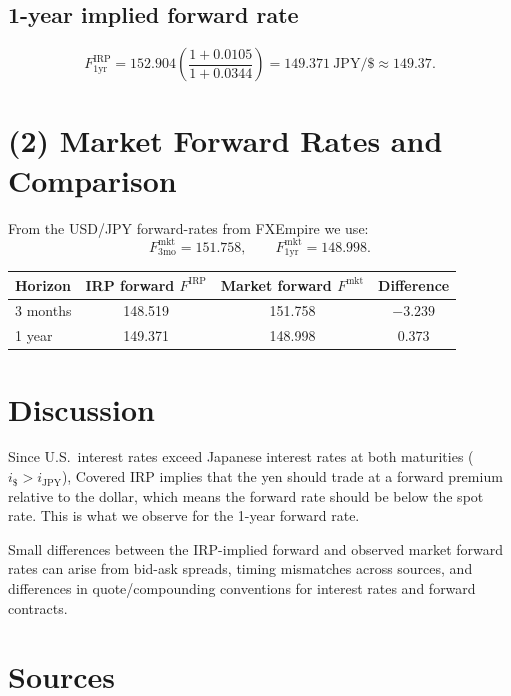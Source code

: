 \documentclass[11pt]{article}
\begin{document}
\subsection*{1-year implied forward rate}
\[
F_{1\text{yr}}^{\text{IRP}}
=
152.904\left(\frac{1+0.0105}{1+0.0344}\right)
=
149.371\ \text{JPY}/\$ \approx 149.37.
\]

\section*{(2) Market Forward Rates and Comparison}

From the USD/JPY forward-rates from FXEmpire we use:
\[
F_{3\text{mo}}^{\text{mkt}} = 151.758, 
\qquad
F_{1\text{yr}}^{\text{mkt}} = 148.998.
\]

\begin{center}
\begin{tabular}{lccc}
\toprule
Horizon & IRP forward $F^{\text{IRP}}$ & Market forward $F^{\text{mkt}}$ & Difference \\
\midrule
3 months & 148.519 & 151.758 & $-3.239$ \\
1 year   & 149.371 & 148.998 & $0.373$ \\
\bottomrule
\end{tabular}
\end{center}

\section*{Discussion}

Since U.S.\ interest rates exceed Japanese interest rates at both maturities ($i_{\$} > i_{\text{JPY}}$),
Covered IRP implies that the yen should trade at a forward premium relative to the dollar, which  means the forward rate should be below the spot rate. This is what we observe for the
1-year forward rate.

Small differences between the IRP-implied forward and observed market forward rates can arise from bid-ask spreads, timing mismatches across sources, and differences in quote/compounding conventions for interest rates and forward contracts.

\section*{Sources}
\end{document}
